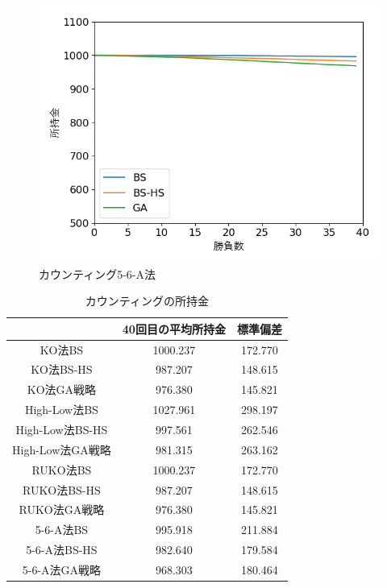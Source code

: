 \begin{figure}[H]
 \begin{center} 
  \includegraphics[width=0.7\linewidth]{./figure/betsimulation-56A}
  \caption{カウンティング5-6-A法\label{56A}}
 \end{center}
\end{figure}

\begin{table}[H]
 \caption{カウンティングの所持金\label{countting}}
 \begin{center}
  \begin{tabular}{|c|c|c|}
  \hline  & 40回目の平均所持金 & 標準偏差 \\
  \hline KO法BS & 1000.237 & 172.770\\
  \hline KO法BS-HS & 987.207 & 148.615 \\
  \hline KO法GA戦略 & 976.380 & 145.821\\
  \hline High-Low法BS & 1027.961 & 298.197\\
  \hline High-Low法BS-HS  & 997.561 & 262.546\\
  \hline High-Low法GA戦略 & 981.315 & 263.162\\
  \hline RUKO法BS & 1000.237 & 172.770\\
  \hline RUKO法BS-HS & 987.207 & 148.615 \\
  \hline RUKO法GA戦略 & 976.380 & 145.821\\
  \hline 5-6-A法BS & 995.918 & 211.884\\
  \hline 5-6-A法BS-HS & 982.640 & 179.584 \\
  \hline 5-6-A法GA戦略 & 968.303 & 180.464\\
  \hline
  \end{tabular}
 \end{center}
\end{table}

